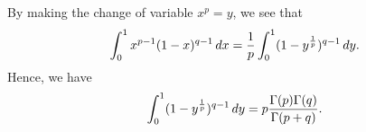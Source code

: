 \documentclass[12pt]{article}
\begin{document}
By making the change of variable $x^p = y$, we see that
\[
\int_0^1 x^{p-1} (1-x)^{q-1} \, dx = {1 \over p}
\int_0^1 (1 - y^{1 \over p})^{q-1} \, dy .
\]
Hence, we have
\[
\int_0^1 (1 - y^{1 \over p})^{q-1} \, dy =
p {\Gamma (p) \Gamma (q) \over \Gamma (p + q)} .
\]
\end{document}
